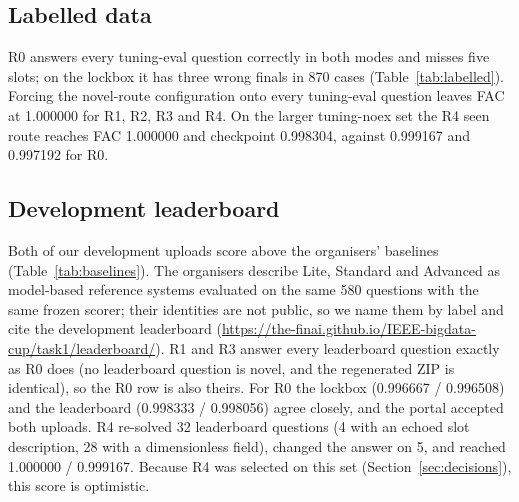 \documentclass[conference]{IEEEtran}
\begin{document}
\subsection{Labelled data}
R0 answers every tuning-eval question correctly in both modes and misses five slots; on the lockbox it has three wrong finals in 870 cases (Table~\ref{tab:labelled}). Forcing the novel-route configuration onto every tuning-eval question leaves FAC at 1.000000 for R1, R2, R3 and R4. On the larger tuning-noex set the R4 seen route reaches FAC 1.000000 and checkpoint 0.998304, against 0.999167 and 0.997192 for R0.

\subsection{Development leaderboard}
Both of our development uploads score above the organisers' baselines (Table~\ref{tab:baselines}). The organisers describe Lite, Standard and Advanced as model-based reference systems evaluated on the same 580 questions with the same frozen scorer; their identities are not public, so we name them by label and cite the development leaderboard (\url{https://the-finai.github.io/IEEE-bigdata-cup/task1/leaderboard/}). R1 and R3 answer every leaderboard question exactly as R0 does (no leaderboard question is novel, and the regenerated ZIP is identical), so the R0 row is also theirs. For R0 the lockbox (0.996667 / 0.996508) and the leaderboard (0.998333 / 0.998056) agree closely, and the portal accepted both uploads. R4 re-solved 32 leaderboard questions (4 with an echoed slot description, 28 with a dimensionless field), changed the answer on 5, and reached 1.000000 / 0.999167. Because R4 was selected on this set (Section~\ref{sec:decisions}), this score is optimistic.
\end{document}
